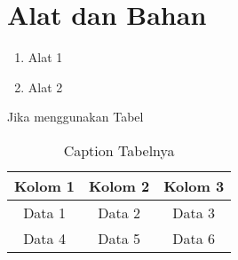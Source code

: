 \section*{Alat dan Bahan}
\indent
\begin{enumerate}
    \item Alat 1
    \item Alat 2
\end{enumerate}

Jika menggunakan Tabel
\begin{table}[h]
    \centering
    \caption{Caption Tabelnya}
    \label{tab:labelini}
    \begin{tabular}{|c|c|c|}
        \hline
        Kolom 1 & Kolom 2 & Kolom 3 \\
        \hline
        Data 1  & Data 2  & Data 3  \\
        Data 4  & Data 5  & Data 6  \\
        \hline
    \end{tabular}
\end{table}